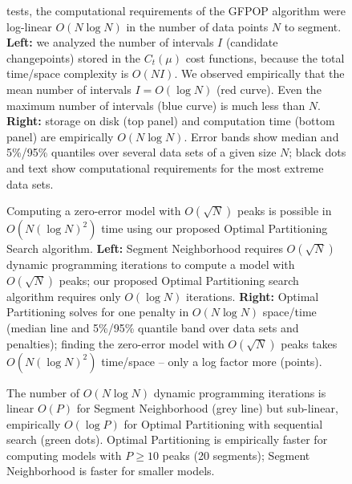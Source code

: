 \documentclass[article]{jss}
\begin{document}
\begin{figure}[t!]
{  tests, the computational requirements of the GFPOP algorithm
  were log-linear $O(N \log N)$ in the number of data points $N$ to
  segment. \textbf{Left:} we analyzed the number of intervals $I$
  (candidate changepoints) stored in the $C_t(\mu)$ cost functions,
  because the total time/space complexity is $O(NI)$. We observed
  empirically that the mean number of intervals $I=O(\log N)$ (red
  curve). Even the maximum number of intervals (blue curve) is much
  less than $N$. \textbf{Right:} storage on disk (top panel) and
  computation time (bottom panel) are empirically $O(N \log N)$. Error
  bands show median and 5\%/95\% quantiles over several data sets of a
  given size $N$; black dots and text show computational requirements
  for the most extreme data sets.}
\end{figure}

\begin{figure}[t!]
\centering
\begin{minipage}{3in}
  
\end{minipage} 
\begin{minipage}{3in} 
   
\end{minipage} 
\caption{\label{fig:evaluations} Computing a zero-error model with
  $O(\sqrt{N})$ peaks is possible in $O(N(\log N)^2)$ time using our
  proposed Optimal Partitioning Search algorithm. \textbf{Left:}
  Segment Neighborhood requires $O(\sqrt{N})$ dynamic programming
  iterations to compute a model with $O(\sqrt{N})$ peaks; our proposed
  Optimal Partitioning search algorithm requires only $O(\log N)$
  iterations. \textbf{Right:} Optimal Partitioning solves for one
  penalty in $O(N\log N)$ space/time (median line and 5\%/95\% quantile band
  over data sets and penalties); finding the zero-error model with
  $O(\sqrt{N})$ peaks takes $O(N (\log N)^2)$ time/space -- only a log
  factor more (points).}
\end{figure} 
  
\begin{figure}[t!]
\centering

\caption{\label{fig:variable-peaks} The number of $O(N \log N)$
  dynamic programming iterations is linear $O(P)$ for Segment
  Neighborhood (grey line) but sub-linear, empirically $O(\log P)$ for
  Optimal Partitioning with sequential search (green dots). Optimal
  Partitioning is empirically faster for computing models with
  $P\geq 10$ peaks (20 segments); Segment Neighborhood is faster for
  smaller models.}
\end{figure}
\end{document}
